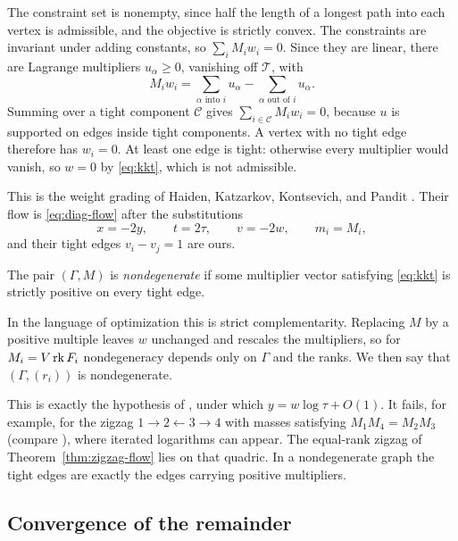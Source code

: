 The constraint set is nonempty, since half the length of a longest path
into each vertex is admissible, and the objective is strictly convex.
The constraints are invariant under adding constants, so
$\sum_iM_iw_i=0$. Since they are linear, there are Lagrange multipliers
$u_\alpha\ge0$, vanishing off $\mathcal T$, with
\begin{equation}\label{eq:kkt}
 M_iw_i=\sum_{\alpha\text{ into }i}u_\alpha
        -\sum_{\alpha\text{ out of }i}u_\alpha .
\end{equation}
Summing over a tight component $\mathcal C$ gives $\sum_{i\in\mathcal C}M_iw_i=0$, because
$u$ is supported on edges inside tight components. A vertex with no tight
edge therefore has $w_i=0$. At least one edge is tight: otherwise every
multiplier would vanish, so $w=0$ by \eqref{eq:kkt}, which is not
admissible.

This is the weight grading of Haiden, Katzarkov, Kontsevich, and Pandit
\cite[Section~3]{HKKP2023}. Their flow \cite[(3.10)]{HKKP2023} is
\eqref{eq:diag-flow} after the substitutions
\[
 x=-2y,\qquad t=2\tau,\qquad v=-2w,\qquad m_i=M_i,
\]
and their tight edges $v_i-v_j=1$ are ours.

\begin{definition}\label{def:nondegenerate}
The pair $(\Gamma,M)$ is \emph{nondegenerate} if some multiplier vector
satisfying \eqref{eq:kkt} is strictly positive on every tight edge.
\end{definition}

In the language of optimization this is strict complementarity. Replacing $M$
by a positive multiple leaves $w$ unchanged and rescales the multipliers,
so for $M_i=V\operatorname{rk} F_i$ nondegeneracy depends only on $\Gamma$ and the ranks.
We then say that $(\Gamma,(r_i))$ is nondegenerate.

This is exactly the hypothesis of \cite[Theorem~3.6]{HKKP2023}, under which
$y=w\log\tau+O(1)$. It fails, for example, for the zigzag
$1\to2\leftarrow3\to4$ with masses satisfying $M_1M_4=M_2M_3$ (compare
\cite[(3.23)--(3.28)]{HKKP2023}),
where iterated logarithms can appear. The equal-rank zigzag of
Theorem~\ref{thm:zigzag-flow} lies on that quadric. In a nondegenerate
graph the tight edges are exactly the edges carrying positive multipliers.

\subsection{Convergence of the remainder}

